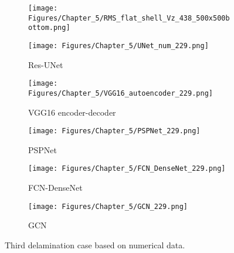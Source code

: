 \begin{figure} [!h]
	\centering
	\begin{subfigure}[b]{.48\textwidth}
		\centering
		\texttt{[image: Figures/Chapter\_5/RMS\_flat\_shell\_Vz\_438\_500x500bottom.png]}
		\caption{}
		\label{fig:RMS_bottom_438}
	\end{subfigure}
	\hfill
	\begin{subfigure}[b]{.48\textwidth}
		\centering
		\texttt{[image: Figures/Chapter\_5/UNet\_num\_229.png]}
		\caption{Res-UNet}
		\label{fig:unet_229}	
	\end{subfigure}
	\hfill
	\begin{subfigure}[b]{.48\textwidth}
		\centering
		\texttt{[image: Figures/Chapter\_5/VGG16\_autoencoder\_229.png]}
		\caption{VGG16 encoder-decoder}
		\label{fig:vgg16_229}
	\end{subfigure}
	\hfill
	\begin{subfigure}[b]{.48\textwidth}
		\centering
		\texttt{[image: Figures/Chapter\_5/PSPNet\_229.png]}
		\caption{PSPNet}
		\label{fig:pspnet_229}	
	\end{subfigure}
	\hfill
	\begin{subfigure}[b]{.48\textwidth}
		\centering
		\texttt{[image: Figures/Chapter\_5/FCN\_DenseNet\_229.png]}
		\caption{FCN-DenseNet}
		\label{fig:densenet_229}
	\end{subfigure}
	\hfill
	\begin{subfigure}[b]{.48\textwidth}
		\centering
		\texttt{[image: Figures/Chapter\_5/GCN\_229.png]}
		\caption{GCN}
		\label{fig:gcn_229}	
	\end{subfigure}
	\caption{Third delamination case based on numerical data.}
	\label{fig:rms_third_case}
\end{figure}


